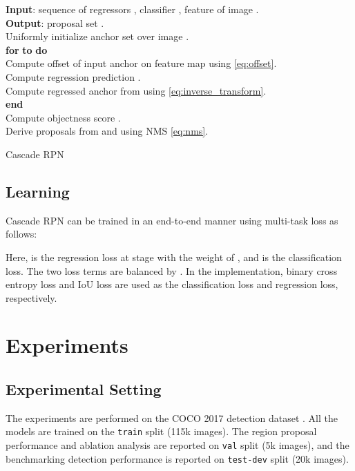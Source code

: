 \documentclass{article}
\begin{document}
	\begin{algorithm}[t]
		\textbf{Input}: sequence of regressors , classifier , feature  of image . \\
		\textbf{Output}: proposal set .\\
		Uniformly initialize anchor set  over image .\\
		\textbf{for}  \textbf{to}  \textbf{do}\\
		\quad Compute offset  of input anchor  on feature map using \eqref{eq:offset}.\\
		\quad Compute regression prediction .\\
		\quad Compute regressed anchor  from  using \eqref{eq:inverse_transform}.\\
		\textbf{end}\\
		Compute objectness score .\\
		Derive proposals  from  and  using NMS \eqref{eq:nms}.
		\caption{Cascade RPN}
		\label{alg:cascade_rpn}
	\end{algorithm}
	
	\subsection{Learning}
	Cascade RPN can be trained in an end-to-end manner using multi-task loss as follows:
	
	Here,  is the regression loss at stage  with the weight of , and  is the classification loss. The two loss terms are balanced by . In the implementation, binary cross entropy loss and IoU loss \citep{unitbox} are used as the classification loss and regression loss, respectively. 
	
	\section{Experiments}
	\subsection{Experimental Setting}
	The experiments are performed on the COCO 2017 detection dataset \citep{COCO}. All the models are trained on the \texttt{train} split (115k images). The region proposal performance and ablation analysis are reported on \texttt{val} split (5k images), and the benchmarking detection performance is reported on \texttt{test-dev} split (20k images).
	
\end{document}
